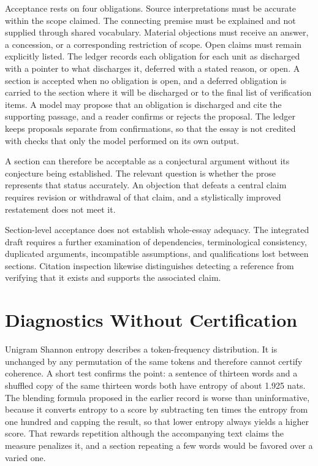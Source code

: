 \documentclass[11pt]{article}
\begin{document}
Acceptance rests on four obligations. Source interpretations must be accurate within the scope claimed. The connecting premise must be explained and not supplied through shared vocabulary. Material objections must receive an answer, a concession, or a corresponding restriction of scope. Open claims must remain explicitly listed. The ledger records each obligation for each unit as discharged with a pointer to what discharges it, deferred with a stated reason, or open. A section is accepted when no obligation is open, and a deferred obligation is carried to the section where it will be discharged or to the final list of verification items. A model may propose that an obligation is discharged and cite the supporting passage, and a reader confirms or rejects the proposal. The ledger keeps proposals separate from confirmations, so that the essay is not credited with checks that only the model performed on its own output.

A section can therefore be acceptable as a conjectural argument without its conjecture being established. The relevant question is whether the prose represents that status accurately. An objection that defeats a central claim requires revision or withdrawal of that claim, and a stylistically improved restatement does not meet it.

Section-level acceptance does not establish whole-essay adequacy. The integrated draft requires a further examination of dependencies, terminological consistency, duplicated arguments, incompatible assumptions, and qualifications lost between sections. Citation inspection likewise distinguishes detecting a reference from verifying that it exists and supports the associated claim.

\section{Diagnostics Without Certification}

Unigram Shannon entropy describes a token-frequency distribution. It is unchanged by any permutation of the same tokens and therefore cannot certify coherence. A short test confirms the point: a sentence of thirteen words and a shuffled copy of the same thirteen words both have entropy of about 1.925 nats. The blending formula proposed in the earlier record is worse than uninformative, because it converts entropy to a score by subtracting ten times the entropy from one hundred and capping the result, so that lower entropy always yields a higher score. That rewards repetition although the accompanying text claims the measure penalizes it, and a section repeating a few words would be favored over a varied one.
\end{document}

